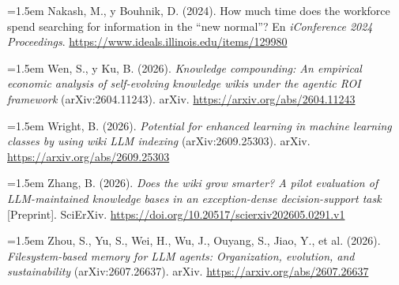\documentclass[11pt,letterpaper]{article}
\newcommand{\refhang}[1]{\par\noindent\hangindent=1.5em\hangafter=1 #1\par}
\begin{document}
\refhang{Nakash, M., y Bouhnik, D. (2024). How much time does the workforce spend searching for information in the ``new normal''? En \textit{iConference 2024 Proceedings}. \url{https://www.ideals.illinois.edu/items/129980}}

\refhang{Wen, S., y Ku, B. (2026). \textit{Knowledge compounding: An empirical economic analysis of self-evolving knowledge wikis under the agentic ROI framework} (arXiv:2604.11243). arXiv. \url{https://arxiv.org/abs/2604.11243}}

\refhang{Wright, B. (2026). \textit{Potential for enhanced learning in machine learning classes by using wiki LLM indexing} (arXiv:2609.25303). arXiv. \url{https://arxiv.org/abs/2609.25303}}

\refhang{Zhang, B. (2026). \textit{Does the wiki grow smarter? A pilot evaluation of LLM-maintained knowledge bases in an exception-dense decision-support task} [Preprint]. SciErXiv. \url{https://doi.org/10.20517/scierxiv202605.0291.v1}}

\refhang{Zhou, S., Yu, S., Wei, H., Wu, J., Ouyang, S., Jiao, Y., et al. (2026). \textit{Filesystem-based memory for LLM agents: Organization, evolution, and sustainability} (arXiv:2607.26637). arXiv. \url{https://arxiv.org/abs/2607.26637}}

\normalsize
\end{document}
